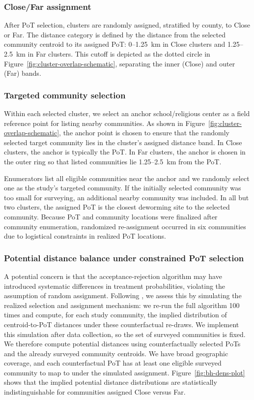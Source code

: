\documentclass[12pt,a4paper]{article}
\begin{document}
\subsubsection*{Close/Far assignment}

After PoT selection, clusters are randomly assigned, stratified by county, to Close or Far. The distance category is defined by the distance from the selected community centroid to its assigned PoT: 0--1.25~km in Close clusters and 1.25--2.5~km in Far clusters. This cutoff is depicted as the dotted circle in Figure~\ref{fig:cluster-overlap-schematic}, separating the inner (Close) and outer (Far) bands.%

\subsubsection*{Targeted community selection}
Within each selected cluster, we select an anchor school/religious center as a field reference point for listing nearby communities. As shown in Figure~\ref{fig:cluster-overlap-schematic}, the anchor point is chosen to ensure that the randomly selected target community lies in the cluster's assigned distance band. In Close clusters, the anchor is typically the PoT. In Far clusters, the anchor is chosen in the outer ring so that listed communities lie 1.25--2.5~km from the PoT.

Enumerators list all eligible communities near the anchor and we randomly select one as the study's targeted community. If the initially selected community was too small for surveying, an additional nearby community was included. In all but two clusters, the assigned PoT is the closest deworming site to the selected community. Because PoT and community locations were finalized after community enumeration, randomized re-assignment occurred in six communities due to logistical constraints in realized PoT locations.


\newpage 

\subsubsection*{Potential distance balance under constrained PoT selection}

A potential concern is that the acceptance-rejection algorithm may have introduced systematic differences in treatment probabilities, violating the assumption of random assignment. Following \citet{borusyak2023nonrandom}, we assess this by simulating the realized selection and assignment mechanism: we re-run the full algorithm 100 times and compute, for each study community, the implied distribution of centroid-to-PoT distances under these counterfactual re-draws. We implement this simulation after data collection, so the set of surveyed communities is fixed. We therefore compute potential distances using counterfactually selected PoTs and the already surveyed community centroids. We have broad geographic coverage, and each counterfactual PoT has at least one eligible surveyed community to map to under the simulated assignment. Figure~\ref{fig:bh-dens-plot} shows that the implied potential distance distributions are statistically indistinguishable for communities assigned Close versus Far.
\end{document}
